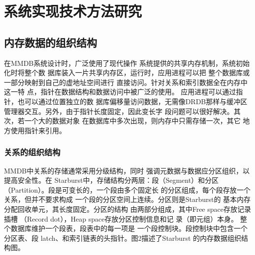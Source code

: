 \documentclass[literaturereview]{zjutreport}
\begin{document}
\begin{table}[htbp]
\caption{主流内存数据库}\label{tab:table2}
\vspace{\baselineskip}
\end{table}

\chapter{系统实现技术方法研究}
\section{内存数据的组织结构}
在MMDB系统设计时，广泛使用了现代操作
系统提供的共享内存机制，系统初始化时将整个数
据库装入一片共享内存区，运行时，应用进程可以把
整个数据库或一部分映射到自己的虚地址空间进行
直接访问。针对关系和索引数据全在内存中这一特
点，指针在数据结构和数据访问中被广泛的使用。
应用进程可以通过指针，也可以通过位置独立的数
据库偏移量访问数据，无需像DRDB那样与缓冲区
管理器交互。另外，由于指针长度固定，因此变长字
段问题可以很好解决。其次，若一个大的数据对象
在数据库中多次出现，则内存中只需存储一次，其它
地方使用指针来引用。

\subsection{关系的组织结构}
MMDB中关系的存储通常采用分级结构，同时
强调元数据与数据应分区组织，以提高安全性。在
Starburst中，存储结构分两层：段（Segment）和分区
（Partition）。段是可变长的，一个段由多个固定长
的分区组成，每个段存放一个关系，但并不要求构成
一个段的分区空间上连续。分区则是Starburst的
基本内存分配回收单元，其长度固定。分区的结构
由两部分组成，其中Free space存放记录插槽
（Record dot），Heap space存放分区控制信息和记
录（即元组）本身。
整个数据库维护一个段表，段表中的每一项是
一个段控制块。段控制块中包含一个分区表、段
latch、和索引链表的头指针。图2描述了Starburst
的内存数据组织结构图。
\end{document}
